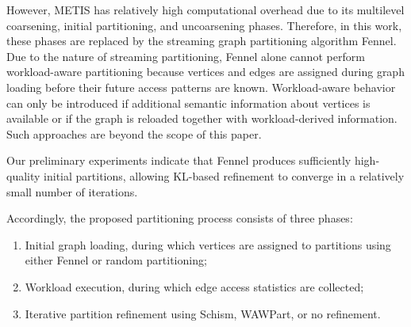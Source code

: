 However, METIS has relatively high computational overhead due to its multilevel coarsening, initial partitioning, and uncoarsening phases. Therefore, in this work, these phases are replaced by the streaming graph partitioning algorithm Fennel. Due to the nature of streaming partitioning, Fennel alone cannot perform workload-aware partitioning because vertices and edges are assigned during graph loading before their future access patterns are known. Workload-aware behavior can only be introduced if additional semantic information about vertices is available or if the graph is reloaded together with workload-derived information. Such approaches are beyond the scope of this paper.

Our preliminary experiments indicate that Fennel produces sufficiently high-quality initial partitions, allowing KL-based refinement to converge in a relatively small number of iterations.

Accordingly, the proposed partitioning process consists of three phases:

\begin{enumerate}
\item Initial graph loading, during which vertices are assigned to partitions using either Fennel or random partitioning;
\item Workload execution, during which edge access statistics are collected;
\item Iterative partition refinement using Schism, WAWPart, or no refinement.
\end{enumerate}

